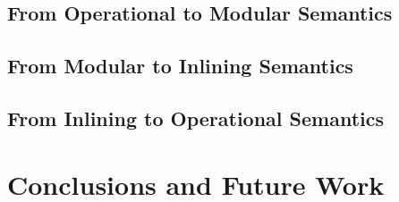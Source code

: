 \documentclass[12pt,twoside]{mitthesis}
\begin{document}
\section{From Operational to Modular Semantics}
\section{From Modular to Inlining Semantics}
\section{From Inlining to Operational Semantics}

\chapter{Conclusions and Future Work}

\appendix


\end{document}
